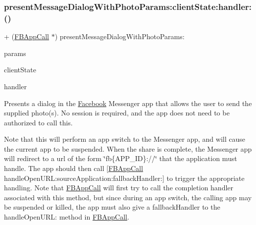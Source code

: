 \subsubsection{\texorpdfstring{present\+Message\+Dialog\+With\+Photo\+Params\+:client\+State\+:handler\+:()}{presentMessageDialogWithPhotoParams:clientState:handler:()}\hspace{0.1cm}{\footnotesize\ttfamily [4/5]}}
{\footnotesize\ttfamily + (\hyperlink{interfaceFBAppCall}{F\+B\+App\+Call} $\ast$) present\+Message\+Dialog\+With\+Photo\+Params\+: \begin{DoxyParamCaption}\item[{(\hyperlink{interfaceFBPhotoParams}{F\+B\+Photo\+Params} $\ast$)}]{params }\item[{clientState:(N\+S\+Dictionary $\ast$)}]{client\+State }\item[{handler:(F\+B\+Dialog\+App\+Call\+Completion\+Handler)}]{handler }\end{DoxyParamCaption}}

Presents a dialog in the \hyperlink{interfaceFacebook}{Facebook} Messenger app that allows the user to send the supplied photo(s). No session is required, and the app does not need to be authorized to call this.

Note that this will perform an app switch to the Messenger app, and will cause the current app to be suspended. When the share is complete, the Messenger app will redirect to a url of the form \char`\"{}fb\{\+A\+P\+P\+\_\+\+I\+D\}\+://\char`\"{} that the application must handle. The app should then call \mbox{[}\hyperlink{interfaceFBAppCall}{F\+B\+App\+Call} handle\+Open\+U\+R\+L\+:source\+Application\+:fallback\+Handler\+:\mbox{]} to trigger the appropriate handling. Note that \hyperlink{interfaceFBAppCall}{F\+B\+App\+Call} will first try to call the completion handler associated with this method, but since during an app switch, the calling app may be suspended or killed, the app must also give a fallback\+Handler to the handle\+Open\+U\+RL\+: method in \hyperlink{interfaceFBAppCall}{F\+B\+App\+Call}.


